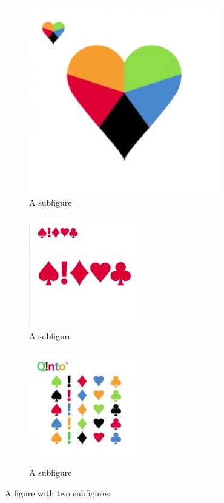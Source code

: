 \documentclass[a4paper]{article}
\begin{document}
\begin{figure}
\centering
\begin{subfigure}{.5\textwidth}
  \centering
  \includegraphics[width=.4\linewidth]{corEscolhivel.jpg}
  \caption{A subfigure}
  \label{fig:sub1}
\end{subfigure}%
\begin{subfigure}{.5\textwidth}
  \centering
  \includegraphics[width=.4\linewidth]{formaEscolhivel.jpg}
  \caption{A subfigure}
  \label{fig:sub2}
\end{subfigure}
\begin{subfigure}{.5\textwidth}
  \centering
  \includegraphics[width=.4\linewidth]{todas.jpg}
  \caption{A subfigure}
  \label{fig:sub3}
\end{subfigure}%
\caption{A figure with two subfigures}
\label{fig:test}
\end{figure}



%
%
\end{document}
